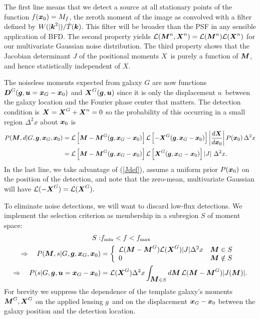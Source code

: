 \documentclass[11pt,preprint,flushrt]{aastex}
\def\eqq#1{Equation~(\ref{#1})}
\newcommand{\vecD}{\mbox{\boldmath $D$}}
\newcommand{\vecX}{\mbox{\boldmath $X$}}
\newcommand{\vecg}{\mbox{\boldmath $g$}}
\newcommand{\vecM}{\mbox{\boldmath $M$}}
\newcommand{\vecx}{\mbox{\boldmath $x$}}
\newcommand{\veck}{\mbox{\boldmath $k$}}
\newcommand{\vecu}{\mbox{\boldmath $u$}}
\newcommand{\bnab}{\boldsymbol{\nabla}}
\newcommand{\likeli}{\mbox{$\mathcal{L}$}}
\newcommand\edit[1]{#1}
\begin{document}
The first line
means that we detect a source at all stationary points of the function
$f(\vecx_0)=M_f$, the zeroth moment of the image as convolved with a
filter defined by $W(|\veck^2|)/\tilde T(\veck).$  This
filter will be broader than the PSF in any sensible application of
BFD. The second property yields $\likeli(\vecM^n,\vecX^n) =
\likeli(\vecM^n)\likeli(\vecX^n)$ for our multivariate Gaussian noise
distribution.  The third property shows that the Jacobian
determinant $J$ of the positional moments \vecX\ is purely a function
of $\vecM$, and hence statistically
independent of \vecX.

\edit{
The noiseless moments expected from galaxy $G$ are now functions 
$\vecD^G(\vecg, \vecu=\vecx_G-\vecx_0)$ and
$\vecX^G(\vecg, \vecu)$ since it is only the displacement \vecu\
between the galaxy location and the Fourier phase center that
matters.  The detection condition is 
$\vecX=\vecX^G+\vecX^n=0$ so the probability of this occurring in a 
small region $\Delta^2x$ about $\vecx_0$ is 
\begin{align}
P(\vecM,d | G, \vecg, \vecx_G, \vecx_0) & =
\likeli\left[\vecM-\vecM^G(\vecg,\vecx_G-\vecx_0)\right] 
          \likeli\left[-\vecX^G(\vecg,\vecx_G-\vecx_0)\right]
          \left| \frac{d\vecX}{d\vecx_0}\right| P(\vecx_0) \, \Delta^2x \\
 & =
\likeli\left[\vecM-\vecM^G(\vecg,\vecx_G-\vecx_0)\right] 
          \likeli\left[\vecX^G(\vecg,\vecx_G-\vecx_0)\right]
          \left| J \right| \, \Delta^2x. 
\end{align}
In the last line, we take advantage of (\ref{Jdef}), assume a uniform
prior $P(\vecx_0)$ on the position of the detection, and note that
the zero-mean, multivariate Gaussian will have $\likeli(-\vecX^G)=\likeli(\vecX^G).$}

To eliminate noise detections, we will want to discard low-flux
detections.  We implement the selection criterion as membership in a
subregion \edit{$S$} of moment space:
\begin{align}
S: & f_{\rm min} < f < f_{\rm max} \\
\label{pMsG1}
\Rightarrow \quad P(\vecM,s | G,\vecg, \vecx_G, \vecx_0) & = \left\{
\begin{array}{ll}
 \likeli(\vecM-\vecM^G) \likeli(\vecX^G) |J| \Delta^2 x& \vecM \in S \\
 0 & \vecM \notin S
\end{array} \right. \\
\label{psG1}
\Rightarrow \quad
P(s | G, \vecg, \vecu=\vecx_G-\vecx_0) & = \likeli(\vecX^G) \Delta^2x \int_{\vecM\in S} d\vecM\,
           \likeli(\vecM-\vecM^G) |J(\vecM)|.
\end{align}
\edit{For brevity we suppress the dependence of the template galaxy's moments
$\vecM^G,\vecX^G$ on the applied lensing \vecg\ and on the
displacement $\vecx_G-\vecx_0$ between the galaxy position and the
detection location.}
\end{document}
